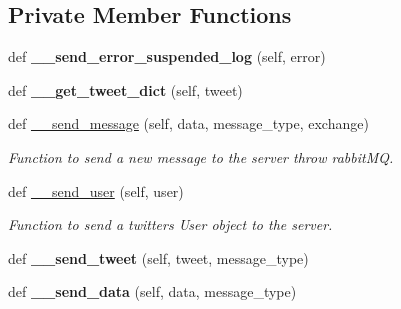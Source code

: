 \subsection*{Private Member Functions}
\begin{DoxyCompactItemize}
\item 
\mbox{\label{classtwitter_1_1bots_1_1twitter__bot_1_1TwitterBot_ab33b0381d07e99d894fec9e77efc73bd}} 
def {\bfseries \+\_\+\+\_\+send\+\_\+error\+\_\+suspended\+\_\+log} (self, error)
\item 
\mbox{\label{classtwitter_1_1bots_1_1twitter__bot_1_1TwitterBot_a6425cd4104d5e9cd8045f1899afa8e7a}} 
def {\bfseries \+\_\+\+\_\+get\+\_\+tweet\+\_\+dict} (self, tweet)
\item 
def \hyperlink{classtwitter_1_1bots_1_1twitter__bot_1_1TwitterBot_ae40a4a851aab620149c9e07364eeb03e}{\+\_\+\+\_\+send\+\_\+message} (self, data, message\+\_\+type, exchange)
\begin{DoxyCompactList}\small\item\em Function to send a new message to the server throw rabbit\+MQ. \end{DoxyCompactList}\item 
def \hyperlink{classtwitter_1_1bots_1_1twitter__bot_1_1TwitterBot_af3e6a1740d3ff39ce4b3bccfe0e8f704}{\+\_\+\+\_\+send\+\_\+user} (self, user)
\begin{DoxyCompactList}\small\item\em Function to send a twitter\textquotesingle{}s User object to the server. \end{DoxyCompactList}\item 
\mbox{\label{classtwitter_1_1bots_1_1twitter__bot_1_1TwitterBot_a0a726cb138067ce896744765c921c2be}} 
def {\bfseries \+\_\+\+\_\+send\+\_\+tweet} (self, tweet, message\+\_\+type)
\item 
\mbox{\label{classtwitter_1_1bots_1_1twitter__bot_1_1TwitterBot_a50d534b742d0505b10a434ebfb2063f4}} 
def {\bfseries \+\_\+\+\_\+send\+\_\+data} (self, data, message\+\_\+type)
\item 
\mbox{\label{classtwitter_1_1bots_1_1twitter__bot_1_1TwitterBot_a00460f90d7276ddedec693817edfd7a5}} 

\end{DoxyCompactItemize}
